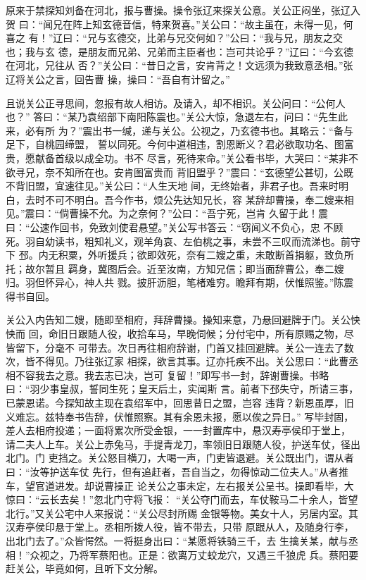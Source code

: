 原来于禁探知刘备在河北，报与曹操。操令张辽来探关公意。关公正闷坐，张辽入贺
曰：“闻兄在阵上知玄德音信，特来贺喜。”关公曰：“故主虽在，未得一见，何喜之
有！”辽曰：“兄与玄德交，比弟与兄交何如？”公曰：“我与兄，朋友之交也；我与玄
德，是朋友而兄弟、兄弟而主臣者也：岂可共论乎？”辽曰：“今玄德在河北，兄往从
否？”关公曰：“昔日之言，安肯背之！文远须为我致意丞相。”张辽将关公之言，回告曹
操，操曰：“吾自有计留之。”

且说关公正寻思间，忽报有故人相访。及请入，却不相识。关公问曰：“公何人也？”
答曰：“某乃袁绍部下南阳陈震也。”关公大惊，急退左右，问曰：“先生此来，必有所
为？”震出书一缄，递与关公。公视之，乃玄德书也。其略云：“备与足下，自桃园缔盟，
誓以同死。今何中道相违，割恩断义？君必欲取功名、图富贵，愿献备首级以成全功。书不
尽言，死待来命。”关公看书毕，大哭曰：“某非不欲寻兄，奈不知所在也。安肯图富贵而
背旧盟乎？”震曰：“玄德望公甚切，公既不背旧盟，宜速往见。”关公曰：“人生天地
间，无终始者，非君子也。吾来时明白，去时不可不明白。吾今作书，烦公先达知兄长，容
某辞却曹操，奉二嫂来相见。”震曰：“倘曹操不允。为之奈何？”公曰：“吾宁死，岂肯
久留于此！震曰：“公速作回书，免致刘使君悬望。”关公写书答云：“窃闻义不负心，忠
不顾死。羽自幼读书，粗知礼义，观羊角哀、左伯桃之事，未尝不三叹而流涕也。前守下
邳。内无积粟，外听援兵；欲即效死，奈有二嫂之重，未敢断首捐躯，致负所托；故尔暂且
羁身，冀图后会。近至汝南，方知兄信；即当面辞曹公，奉二嫂归。羽但怀异心，神人共
戮。披肝沥胆，笔楮难穷。瞻拜有期，伏惟照鉴。”陈震得书自回。

关公入内告知二嫂，随即至相府，拜辞曹操。操知来意，乃悬回避牌于门。关公怏怏而
回，命旧日跟随人役，收拾车马，早晚伺候；分付宅中，所有原赐之物，尽皆留下，分毫不
可带去。次日再往相府辞谢，门首又挂回避牌。关公一连去了数次，皆不得见。乃往张辽家
相探，欲言其事。辽亦托疾不出。关公思曰：“此曹丞相不容我去之意。我去志已决，岂可
复留！”即写书一封，辞谢曹操。书略曰：“羽少事皇叔，誓同生死；皇天后土，实闻斯
言。前者下邳失守，所请三事，已蒙恩诺。今探知故主现在袁绍军中，回思昔日之盟，岂容
违背？新恩虽厚，旧义难忘。兹特奉书告辞，伏惟照察。其有余恩未报，愿以俟之异日。”
写毕封固，差人去相府投递；一面将累次所受金银，一一封置库中，悬汉寿亭侯印于堂上，
请二夫人上车。关公上赤兔马，手提青龙刀，率领旧日跟随人役，护送车仗，径出北门。门
吏挡之。关公怒目横刀，大喝一声，门吏皆退避。关公既出门，谓从者曰：“汝等护送车仗
先行，但有追赶者，吾自当之，勿得惊动二位夫人。”从者推车，望官道进发。却说曹操正
论关公之事未定，左右报关公呈书。操即看毕，大惊曰：“云长去矣！”忽北门守将飞报：
“关公夺门而去，车仗鞍马二十余人，皆望北行。”又关公宅中人来报说：“关公尽封所赐
金银等物。美女十人，另居内室。其汉寿亭侯印悬于堂上。丞相所拨人役，皆不带去，只带
原跟从人，及随身行李，出北门去了。”众皆愕然。一将挺身出曰：“某愿将铁骑三千，去
生擒关某，献与丞相！”众视之，乃将军蔡阳也。正是：欲离万丈蛟龙穴，又遇三千狼虎
兵。蔡阳要赶关公，毕竟如何，且听下文分解。